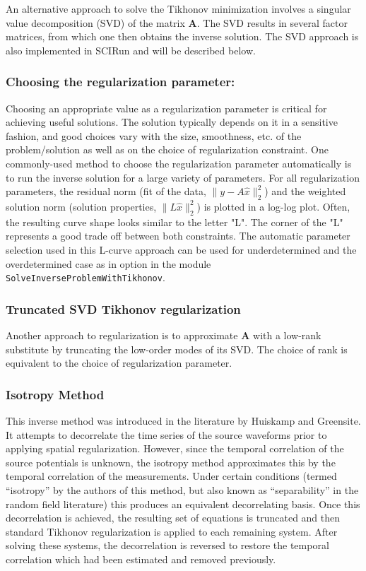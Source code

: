 \documentclass[fleqn,11pt,openany]{book}
\begin{document}
An alternative approach to solve the Tikhonov minimization involves a singular value
decomposition (SVD) of the matrix $\mathbf{A}$. The SVD results in several factor matrices, from which one then obtains the inverse solution. The SVD approach is also implemented in SCIRun and will be described below.

\subsubsection{Choosing the regularization parameter:}

Choosing an appropriate value as a regularization parameter is critical for achieving useful solutions.
The solution typically depends on it in a sensitive fashion, and good
choices vary with the size, smoothness, etc. of the problem/solution as well as on the
choice of regularization constraint. One commonly-used method to choose the
regularization parameter automatically is to run the inverse solution for a
large variety of parameters. For all regularization parameters, the residual
norm (fit of the data, $\| y - A \hat{x} \|^{2}_{2} $) and the weighted
solution norm (solution properties, $\|L\hat{x} \|^{2}_{2}$) is plotted in a log-log plot. Often,
the resulting curve shape looks similar to the letter
"L". The corner of the "L" represents a good trade off between both
constraints. The automatic parameter selection used in this L-curve approach
can be used for underdetermined and the overdetermined case as in option in
the module {\tt SolveInverseProblemWithTikhonov}.

\subsubsection{Truncated SVD Tikhonov regularization}

Another approach to regularization is to approximate $\mathbf{A}$ with a
low-rank substitute by truncating the low-order modes of its SVD. The
choice of rank is equivalent to the choice of regularization parameter.

\subsubsection{Isotropy Method}

This inverse method was introduced in the literature by Huiskamp and
Greensite.
It attempts to decorrelate the time series of the source waveforms prior to
applying spatial regularization.
However, since the temporal correlation of the source potentials
is unknown, the isotropy method approximates this by the temporal
correlation of the measurements. Under certain conditions (termed ``isotropy'' by the
authors of this method, but also known as ``separability'' in
the random field literature)
this produces an equivalent decorrelating basis. Once this decorrelation is
achieved, the resulting set of equations is truncated and then standard
Tikhonov regularization is applied to each remaining system. After solving
these systems, the decorrelation is reversed to restore the
temporal correlation which had been estimated and removed previously.
\end{document}
